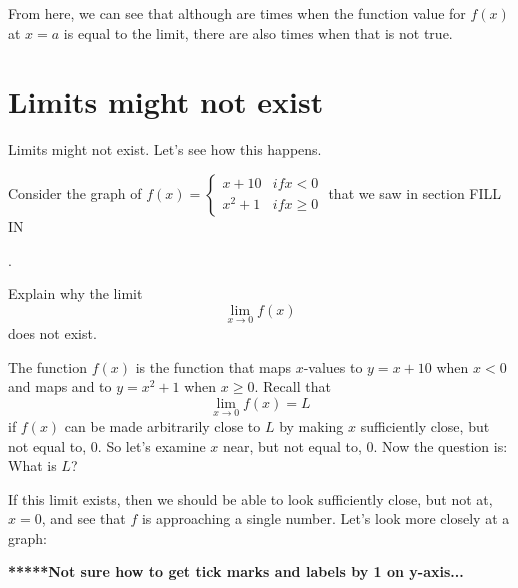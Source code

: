 \documentclass{ximera}
\begin{document}
From here, we can see that although are times when the function value for $f(x)$ at $x=a$ is equal to the limit, there are also times when that is not true.




\section{Limits might not exist}

Limits might not exist. Let's see how this happens.


\begin{example}
  Consider the graph of 
$f(x)=\begin{cases} x+10 & \textit{if}x<0\\x^2+1 & \textit{if} x\geq 0\end{cases}$
that we saw in section FILL IN
\begin{image}
.
\end{image}

Explain why the limit
\[
\lim_{x\to 0} f(x)
\]
does not exist.
\begin{explanation}
The function $f(x)$ is the function that maps $x$-values to $y=x+10$ when $x<0$ and maps and to $y=x^2+1$ when $x\geq 0$. Recall that
\[
\lim_{x\to 0} f(x)  = L
\]
if $f(x)$ can be made arbitrarily close to $L$ by making
$x$ sufficiently close, but not equal to, $0$. So let's examine $x$
near, but not equal to, $0$. Now the question is: What is $L$?



If this limit exists, then we should be able to look sufficiently
close, but not at, $x=0$, and see that $f$ is approaching a single number.
Let's look more closely at a graph:


\textbf{*****Not sure how to get tick marks and labels by 1 on y-axis...}

\begin{image}

\end{image}


\end{explanation}
\end{example}
\end{document}
